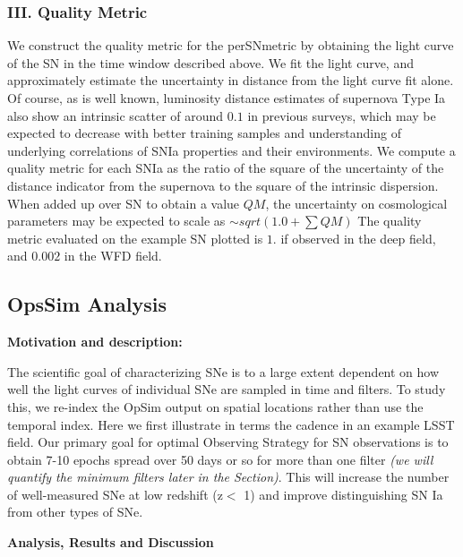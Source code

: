 \subsubsection{III. Quality Metric}
We construct the quality metric for the perSNmetric by obtaining the light curve of the SN
in the time window described above. We fit the light curve, and approximately estimate the
uncertainty in distance from the light curve fit alone. Of course, as is well known,
luminosity distance estimates of supernova Type Ia also show an intrinsic scatter of
around $0.1$ in previous surveys, which may be expected to decrease with better training
samples and understanding of underlying correlations of SNIa properties and their
environments. We compute a quality metric for each SNIa as the ratio of the square of the
uncertainty of the distance indicator from the supernova to the square of the intrinsic
dispersion. When added up over SN to obtain a value $QM$, the uncertainty on cosmological
parameters may be expected to scale as $\sim sqrt(1.0 + \sum QM)$ The quality metric evaluated on 
the example SN plotted is $1.$ if observed in the deep field, and $0.002$ in
the WFD field.





\subsection{OpsSim Analysis}
\label{sec:\secname:analysis}

{\bf Motivation and description:}

The scientific goal of characterizing SNe is to a large extent dependent on
how well the light curves of individual SNe are sampled in time and filters. To study
this, we re-index the OpSim output on spatial locations rather than use the temporal
index. Here we first
illustrate  in terms the cadence in an example LSST field. Our primary goal for optimal Observing
Strategy for SN observations is to obtain 7-10 epochs spread over 50 days or so for more than one filter {\it (we
will quantify the minimum filters later in the Section)}. This will increase the number of
well-measured SNe at low redshift (z$<$ 1) and improve distinguishing SN Ia from other
types of SNe.

{\bf Analysis, Results and Discussion}


